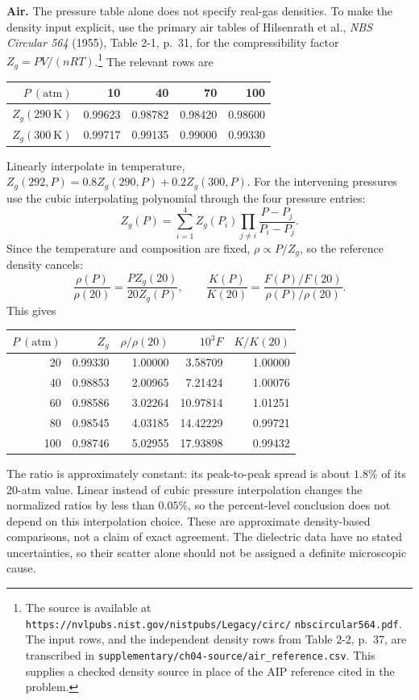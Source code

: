 \textbf{Air.} The pressure table alone does not specify real-gas
densities. To make the density input explicit, use the primary air
tables of Hilsenrath et al., \emph{NBS Circular 564} (1955),
Table 2-1, p.~31, for the compressibility factor
$Z_g=PV/(nRT)$.\footnote{\raggedright The source is available at
\texttt{https://nvlpubs.nist.gov/nistpubs/Legacy/circ/}\allowbreak
\texttt{nbscircular564.pdf}. The input rows, and the independent density
rows from Table 2-2, p.~37, are transcribed in
\texttt{supplementary/ch04-source/air\_reference.csv}.
This supplies a checked density source in place of the AIP reference
cited in the problem.}
The relevant rows are
\begin{center}
\begin{tabular}{rrrrr}
\toprule
$P\ (\mathrm{atm})$&10&40&70&100\\
\midrule
$Z_g(290\ \mathrm K)$&0.99623&0.98782&0.98420&0.98600\\
$Z_g(300\ \mathrm K)$&0.99717&0.99135&0.99000&0.99330\\
\bottomrule
\end{tabular}
\end{center}
Linearly interpolate in temperature,
$Z_g(292,P)=0.8Z_g(290,P)+0.2Z_g(300,P)$.
For the intervening pressures use the cubic interpolating polynomial
through the four pressure entries:
\[
Z_g(P)=\sum_{i=1}^4 Z_g(P_i)
\prod_{j\ne i}\frac{P-P_j}{P_i-P_j}.
\]
Since the temperature and composition are fixed,
$\rho\propto P/Z_g$, so the reference density cancels:
\[
\frac{\rho(P)}{\rho(20)}=\frac{PZ_g(20)}{20Z_g(P)},\qquad
\frac{K(P)}{K(20)}=
\frac{F(P)/F(20)}{\rho(P)/\rho(20)}.
\]
This gives
\begin{center}
\begin{tabular}{rrrrr}
\toprule
$P\ (\mathrm{atm})$ & $Z_g$ & $\rho/\rho(20)$ & $10^3F$ & $K/K(20)$\\
\midrule
20 & 0.99330 & 1.00000 & 3.58709 & 1.00000\\
40 & 0.98853 & 2.00965 & 7.21424 & 1.00076\\
60 & 0.98586 & 3.02264 & 10.97814 & 1.01251\\
80 & 0.98545 & 4.03185 & 14.42229 & 0.99721\\
100 & 0.98746 & 5.02955 & 17.93898 & 0.99432\\
\bottomrule
\end{tabular}
\end{center}
The ratio is approximately constant: its peak-to-peak spread is about
$1.8\%$ of its 20-atm value. Linear instead of cubic pressure
interpolation changes the normalized ratios by less than $0.05\%$,
so the percent-level conclusion does not depend on this interpolation
choice. These are approximate density-based comparisons, not a claim
of exact agreement. The dielectric data have no stated uncertainties,
so their scatter alone should not be assigned a definite microscopic
cause.

